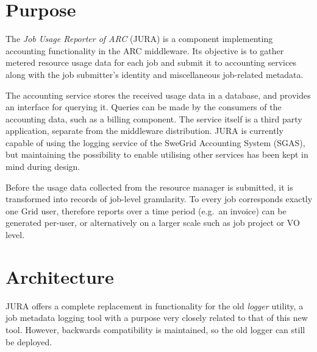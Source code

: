 \documentclass{article}                            %
\begin{document}
\newpage

\section{Purpose}

The \textit{Job Usage Reporter of ARC} (JURA) is a component
implementing accounting functionality in the ARC middleware. Its
objective is to gather metered resource usage data for each job and
submit it to accounting services along with the job submitter's
identity and miscellaneous job-related metadata.

The accounting service stores the received usage data in a database,
and provides an interface for querying it. Queries can be made by the
consumers of the accounting data, such as a billing component. The
service itself is a third party application, separate from the
middleware distribution. JURA is currently capable of using the
logging service of the SweGrid Accounting System (SGAS)\cite{sgas},
but maintaining the possibility to enable utilising other services has
been kept in mind during design.

Before the usage data collected from the resource manager is
submitted, it is transformed into records of job-level granularity. To
every job corresponds exactly one Grid user, therefore reports over a
time period (e.g.~an invoice) can be generated per-user, or
alternatively on a larger scale such as job project or VO level.

\section{Architecture}

\begin{figure}[ht]
\end{figure}

JURA offers a complete replacement in functionality for the old
\textit{logger} utility\cite{logger}, a job metadata logging tool with
a purpose very closely related to that of this new tool. However,
backwards compatibility is maintained, so the old logger can still be
deployed.
\end{document}
